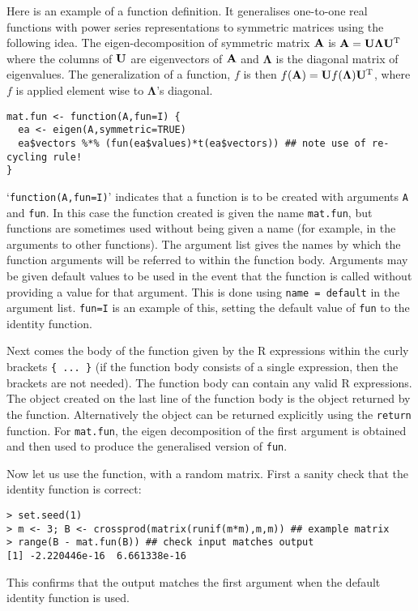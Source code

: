 \documentclass[10pt] {article}
\newcommand{\ts}{^{\rm T}}
\theoremstyle{definition}
\begin{document}
Here is an example of a function definition. It generalises one-to-one real functions with power series representations to symmetric matrices using the following idea. The eigen-decomposition of symmetric matrix ${\bf A}$ is ${\bf A} = {\bf U}{\bm \Lambda}{\bf U}\ts$ where the columns of ${\bf U}$ are eigenvectors of $\bf A$ and ${\bm \Lambda}$ is the diagonal matrix of eigenvalues. The generalization of a function, $f$ is then $f({\bf A}) = {\bf U} f({\bm \Lambda}){\bf U}\ts$, where $f$ is applied element wise to $\bm \Lambda$'s diagonal. 
\begin{lstlisting}
mat.fun <- function(A,fun=I) {
  ea <- eigen(A,symmetric=TRUE)
  ea$vectors %*% (fun(ea$values)*t(ea$vectors)) ## note use of re-cycling rule!
}
\end{lstlisting}
`{\lstinline+function(A,fun=I)+}' indicates that a function is to be created with arguments {\lstinline+A+} and {\lstinline+fun+}. In this case the function created is given the name {\lstinline+mat.fun+}, but functions are sometimes used without being given a name (for example, in the arguments to other functions). The argument list gives the names by which the function arguments will be referred to within the function body. Arguments may be given default values to be used in the event that the function is called without providing a value for that argument. This is done using \lstinline$name = default$ in the argument list. \lstinline+fun=I+ is an example of this, setting the default value of {\lstinline+fun+} to the identity function. 

Next comes the body of the function given by the R expressions within the curly brackets \lstinline+{ ... }+ (if the function body consists of a single expression, then the brackets are not needed). The function body can contain any valid R expressions. The object created on the last line of the function body is the object returned by the function. Alternatively the object can be returned explicitly using the {\lstinline+return+} function. For \lstinline+mat.fun+, the eigen decomposition of the first argument is obtained and then used to produce the generalised version of {\lstinline+fun+}. 

Now let us use the function, with a random matrix. First a sanity check that the identity function is correct:
\begin{lstlisting}
> set.seed(1)
> m <- 3; B <- crossprod(matrix(runif(m*m),m,m)) ## example matrix
> range(B - mat.fun(B)) ## check input matches output
[1] -2.220446e-16  6.661338e-16
\end{lstlisting}
This confirms that the output matches the first argument when the default identity function is used.
\end{document}
